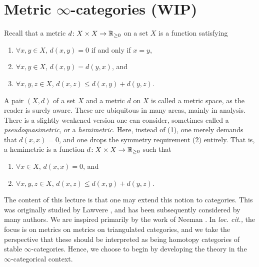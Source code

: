 
\section{Metric \(\infty\)-categories (WIP)}
Recall that a metric \(d\!:X\times X\to \mathbb{R}_{\geq 0}\) on a set \(X\) is a function satisfying
\begin{enumerate}[label=(\arabic*)]
	\item \(\forall x,y\in X\), \(d(x,y) = 0\) if and only if \(x=y\),
	\item \(\forall x,y\in X\), \(d(x,y) = d(y,x)\), and
	\item \(\forall x,y,z\in X\), \(d(x,z) \leq d(x,y) + d(y,z)\).
\end{enumerate}
A pair \((X,d)\) of a set \(X\) and a metric \(d\) on \(X\) is called a metric space, as the reader is surely aware. These are ubiquitous in many areas, mainly in analysis.
There is a slightly weakened version one can consider, sometimes called a \emph{pseudoquasimetric,} or a \emph{hemimetric.} Here, instead of (1), one merely demands that \(d(x,x)=0\),
and one drops the symmetry requirement (2) entirely. That is, a hemimetric is a function \(d\!:X\times X \to \mathbb{R}_{\geq 0}\) such that
\begin{enumerate}[label=(\arabic*')]
	\item \(\forall x\in X\), \(d(x,x)=0\), and
	\item \(\forall x,y,z\in X\), \(d(x,z) \leq d(x,y) + d(y,z)\).
\end{enumerate}
The content of this lecture is that one may extend this notion to categories. This was originally studied by Lawvere \cite{lawvere73-metric-spaces}, and has been subsequently considered by many authors.
We are inspired primarily by the work of Neeman \cite{neeman2021metricstriangulatedcategories}. In \emph{loc. cit.,} the focus is on metrics on metrics on triangulated categories, and
we take the perspective that these should be interpreted as being homotopy categories of stable \(\infty\)-categories. Hence, we choose to begin by developing the theory in the
\(\infty\)-categorical context.


